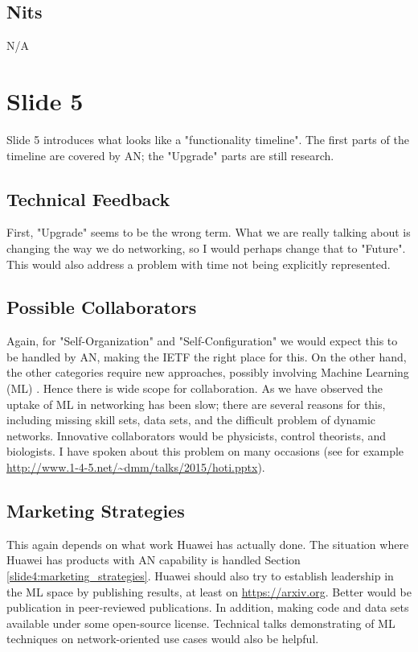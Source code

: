 \documentclass[11pt, oneside]{article}   	%
\begin{document}
\subsection{Nits}
\label{slide4:nits}
N/A

\section{Slide 5}
\label{sec:slide5}

Slide 5 introduces what looks like a "functionality timeline". The first parts of the timeline are covered by AN; the "Upgrade" parts are still research.


\subsection{Technical Feedback}
\label{slide5:technical_feedback}
First, "Upgrade" seems to be the wrong term. What we are really talking about is changing the way we do networking, so I would perhaps change that to "Future". This 
would also address a problem with time not being explicitly represented.

\subsection{Possible Collaborators}
\label{slide5:possible_collaborators}
Again, for "Self-Organization" and "Self-Configuration"  we would expect this to be handled by AN, making the IETF the right place for this. On the other hand, the other 
categories require new approaches, possibly involving Machine Learning (ML)  \cite{2017arXiv170908339W}. Hence there is wide scope for collaboration. As we have observed
the uptake of ML in networking has been slow; there are several reasons for this, including missing skill sets, data sets, and the difficult problem of dynamic networks. 
Innovative collaborators would be physicists, control theorists, and biologists. I have spoken about this problem on many occasions (see for example 
\url{http://www.1-4-5.net/~dmm/talks/2015/hoti.pptx}).

\subsection{Marketing Strategies}
\label{slide5:marketing_strategies}
This again depends on what work Huawei has actually done. The situation where Huawei has products with AN capability is handled Section \ref{slide4:marketing_strategies}.
Huawei should also try to establish leadership in the ML space by publishing results, at least on \url{https://arxiv.org}. Better would be publication in peer-reviewed publications.
In addition, making code and data sets available under some open-source license. Technical talks demonstrating of ML techniques on network-oriented use cases would also
be helpful.
    
\end{document}
